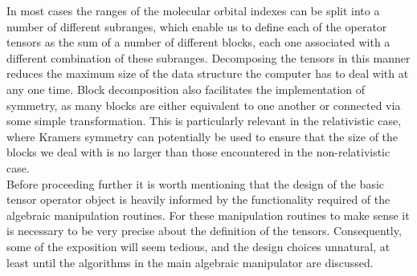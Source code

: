 In most cases the ranges of the molecular orbital indexes can be split into a
number of different subranges, which enable us to define each of the operator
tensors as the sum of a number of different blocks, each one associated with a
different combination of these subranges. Decomposing the tensors in this
manner reduces the maximum size of the data structure the computer has to deal
with at any one time. Block decomposition also facilitates the implementation
of symmetry, as many blocks are either equivalent to one another or connected
via some simple transformation. This is particularly relevant in the
relativistic case, where Kramers symmetry can potentially be used to ensure
that the size of the blocks we deal with is no larger than those encountered in
the non-relativistic case.\\

\noindent Before proceeding further it is worth mentioning that the design of
the basic tensor operator object is heavily informed by the functionality
required of the algebraic manipulation routines. For these manipulation 
routines to make sense it is necessary to be very precise about the 
definition of the tensors. Consequently, some of the exposition will 
seem tedious, and the design choices unnatural, at least until the algorithms in the main algebraic
manipulator are discussed.\\ 

